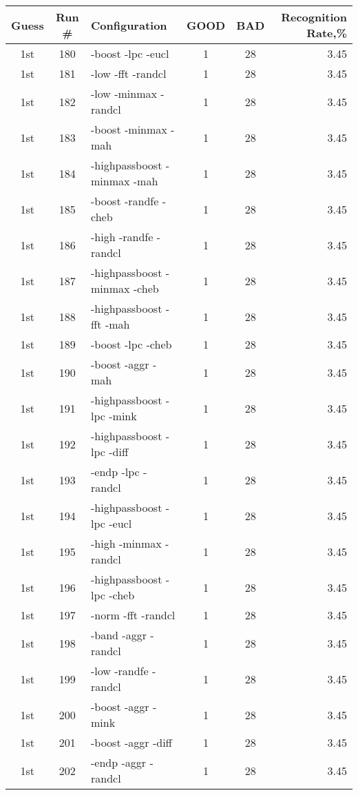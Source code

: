 \begin{table}
\begin{minipage}[b]{\textwidth}
\centering
\begin{tabular}{|c|c|l|c|c|r|} \hline
Guess & Run \# & Configuration & GOOD & BAD & Recognition Rate,\%\\ \hline\hline
1st & 180 & -boost -lpc -eucl  & 1 & 28 & 3.45\\ \hline
1st & 181 & -low -fft -randcl  & 1 & 28 & 3.45\\ \hline
1st & 182 & -low -minmax -randcl  & 1 & 28 & 3.45\\ \hline
1st & 183 & -boost -minmax -mah  & 1 & 28 & 3.45\\ \hline
1st & 184 & -highpassboost -minmax -mah  & 1 & 28 & 3.45\\ \hline
1st & 185 & -boost -randfe -cheb  & 1 & 28 & 3.45\\ \hline
1st & 186 & -high -randfe -randcl  & 1 & 28 & 3.45\\ \hline
1st & 187 & -highpassboost -minmax -cheb  & 1 & 28 & 3.45\\ \hline
1st & 188 & -highpassboost -fft -mah  & 1 & 28 & 3.45\\ \hline
1st & 189 & -boost -lpc -cheb  & 1 & 28 & 3.45\\ \hline
1st & 190 & -boost -aggr -mah  & 1 & 28 & 3.45\\ \hline
1st & 191 & -highpassboost -lpc -mink  & 1 & 28 & 3.45\\ \hline
1st & 192 & -highpassboost -lpc -diff  & 1 & 28 & 3.45\\ \hline
1st & 193 & -endp -lpc -randcl  & 1 & 28 & 3.45\\ \hline
1st & 194 & -highpassboost -lpc -eucl  & 1 & 28 & 3.45\\ \hline
1st & 195 & -high -minmax -randcl  & 1 & 28 & 3.45\\ \hline
1st & 196 & -highpassboost -lpc -cheb  & 1 & 28 & 3.45\\ \hline
1st & 197 & -norm -fft -randcl  & 1 & 28 & 3.45\\ \hline
1st & 198 & -band -aggr -randcl  & 1 & 28 & 3.45\\ \hline
1st & 199 & -low -randfe -randcl  & 1 & 28 & 3.45\\ \hline
1st & 200 & -boost -aggr -mink  & 1 & 28 & 3.45\\ \hline
1st & 201 & -boost -aggr -diff  & 1 & 28 & 3.45\\ \hline
1st & 202 & -endp -aggr -randcl  & 1 & 28 & 3.45\\ \hline

\end{tabular}
\end{minipage}
\end{table}
